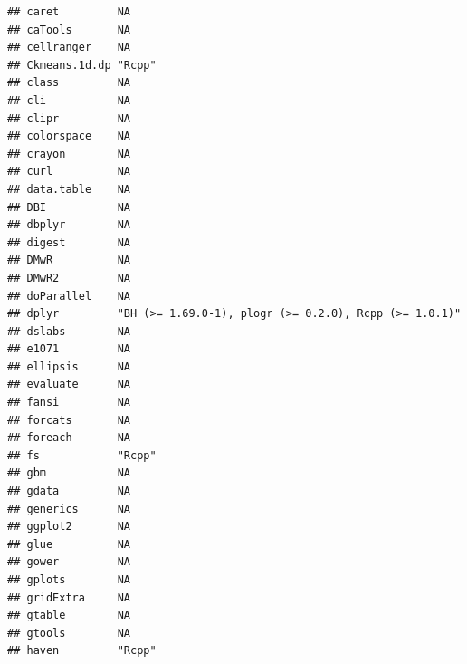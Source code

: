 \documentclass[]{article}
\begin{document}
\begin{verbatim}
## caret         NA                                                   
## caTools       NA                                                   
## cellranger    NA                                                   
## Ckmeans.1d.dp "Rcpp"                                               
## class         NA                                                   
## cli           NA                                                   
## clipr         NA                                                   
## colorspace    NA                                                   
## crayon        NA                                                   
## curl          NA                                                   
## data.table    NA                                                   
## DBI           NA                                                   
## dbplyr        NA                                                   
## digest        NA                                                   
## DMwR          NA                                                   
## DMwR2         NA                                                   
## doParallel    NA                                                   
## dplyr         "BH (>= 1.69.0-1), plogr (>= 0.2.0), Rcpp (>= 1.0.1)"
## dslabs        NA                                                   
## e1071         NA                                                   
## ellipsis      NA                                                   
## evaluate      NA                                                   
## fansi         NA                                                   
## forcats       NA                                                   
## foreach       NA                                                   
## fs            "Rcpp"                                               
## gbm           NA                                                   
## gdata         NA                                                   
## generics      NA                                                   
## ggplot2       NA                                                   
## glue          NA                                                   
## gower         NA                                                   
## gplots        NA                                                   
## gridExtra     NA                                                   
## gtable        NA                                                   
## gtools        NA                                                   
## haven         "Rcpp"                                               

\end{verbatim}
\end{document}
